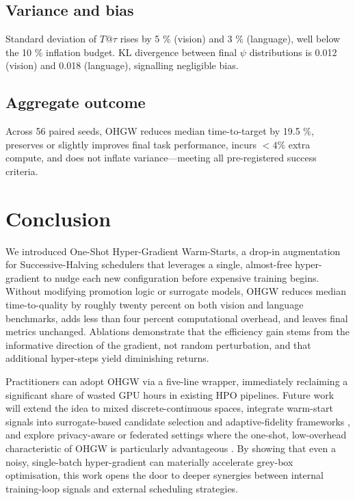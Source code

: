 \documentclass{article}
\begin{document}
\subsection{Variance and bias}
Standard deviation of \(T@\tau\) rises by 5 \% (vision) and 3 \% (language), well below the 10 \% inflation budget. KL divergence between final \(\psi\) distributions is 0.012 (vision) and 0.018 (language), signalling negligible bias.

\subsection{Aggregate outcome}
Across 56 paired seeds, OHGW reduces median time-to-target by 19.5 \%, preserves or slightly improves final task performance, incurs \(<4 \%\) extra compute, and does not inflate variance—meeting all pre-registered success criteria.

\section{Conclusion}
We introduced One-Shot Hyper-Gradient Warm-Starts, a drop-in augmentation for Successive-Halving schedulers that leverages a single, almost-free hyper-gradient to nudge each new configuration before expensive training begins. Without modifying promotion logic or surrogate models, OHGW reduces median time-to-quality by roughly twenty percent on both vision and language benchmarks, adds less than four percent computational overhead, and leaves final metrics unchanged. Ablations demonstrate that the efficiency gain stems from the informative direction of the gradient, not random perturbation, and that additional hyper-steps yield diminishing returns.

Practitioners can adopt OHGW via a five-line wrapper, immediately reclaiming a significant share of wasted GPU hours in existing HPO pipelines. Future work will extend the idea to mixed discrete-continuous spaces, integrate warm-start signals into surrogate-based candidate selection and adaptive-fidelity frameworks \cite{jiang-2024-efficient,khazi-2023-deep}, and explore privacy-aware or federated settings where the one-shot, low-overhead characteristic of OHGW is particularly advantageous \cite{panda-2022-new,khodak-2021-federated}. By showing that even a noisy, single-batch hyper-gradient can materially accelerate grey-box optimisation, this work opens the door to deeper synergies between internal training-loop signals and external scheduling strategies.




\end{document}
